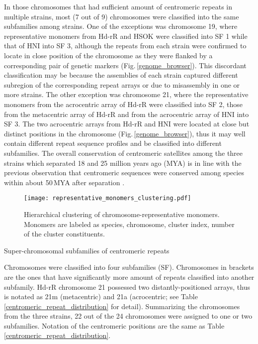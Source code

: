   In those chromosomes that had sufficient amount of centromeric repeats in multiple strains, most (7 out of 9) chromosomes were classified into the same subfamilies among strains. One of the exceptions was chromosome 19, where representative monomers from Hd-rR and HSOK were classified into SF 1 while that of HNI into SF 3, although the repeats from each strain were confirmed to locate in close position of the chromosome as they were flanked by a corresponding pair of genetic markers (Fig.\,\ref{genome_browser}). This discordant classification may be because the assemblies of each strain captured different subregion of the corresponding repeat arrays or due to misassembly in one or more strains. The other exception was chromosome 21, where the representative monomers from the acrocentric array of Hd-rR were classified into SF 2, those from the metacentric array of Hd-rR and from the acrocentric array of HNI into SF 3. The two acrocentric arrays from Hd-rR and HNI were located at close but distinct positions in the chromosome (Fig.\,\ref{genome_browser}), thus it may well contain different repeat sequence profiles and be classified into different subfamilies. The overall conservation of centromeric satellites among the three strains which separated 18 and 25 million years ago (MYA) is in line with the previous observation that centromeric sequences were conserved among species within about 50\,MYA after separation \cite{Melters2013}.

  \begin{figure*}
    \centering
    \texttt{[image: representative\_monomers\_clustering.pdf]}
    \caption{
      Hierarchical clustering of chromosome-representative monomers. Monomers are labeled as species, chromosome, cluster index, number of the cluster constituents.
    }
    \label{monomer_clustering}
  \end{figure*}

  \begin{table*}
    \centering
    \caption{Super-chromosomal subfamilies of centromeric repeats}
    
    \label{super_chromosomal_subfamily}
    \caption*{{\small
      Chromosomes were classified into four subfamilies (SF). Chromosomes in brackets are the ones that have significantly more amount of repeats classified into another subfamily. Hd-rR chromosome 21 possessed two distantly-positioned arrays, thus is notated as 21m (metacentric) and 21a (acrocentric; see Table \ref{centromeric_repeat_distribution} for detail). Summarizing the chromosomes from the three strains, 22 out of the 24 chromosomes were assigned to one or two subfamilies. Notation of the centromeric positions are the same as Table \ref{centromeric_repeat_distribution}.
    }}
  \end{table*}


